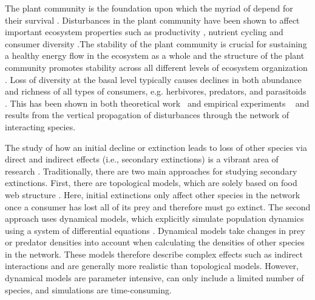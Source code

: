 \documentclass[12pt]{article}
\begin{document}
\begin{spacing}{2.0}
     The plant community is the foundation upon which the myriad of depend for their survival \citep{}. Disturbances in the plant community have been shown to affect important ecosystem properties such as productivity \citep{}, nutrient cycling \citep{} and consumer diversity \citep{scherber2010bottom}.The stability of the plant community is crucial for sustaining a healthy energy flow in the ecosystem as a whole \citep{Rosenblatt2016} and the structure of the plant community promotes stability across all different levels of ecosystem organization \citep{proulx2010diversity,scherber2010bottom}. Loss of diversity at the basal level typically causes declines in both abundance and richness of all types of consumers, e.g. herbivores, predators, and parasitoids \citep{scherber2010bottom}.
     This has been shown in both theoretical work~\citep{} and empirical experiments ~\citep{} and results from the vertical propagation of disturbances through the network of interacting species.
    
    The study of how an initial decline or extinction leads to loss of other species via direct and indirect effects (i.e., secondary extinctions) is a vibrant area of research \citep{curtsdotter2011robustness, dunne2009cascading, eklof2006species}. Traditionally, there are two main approaches for studying secondary extinctions. First, there are topological models, which are solely based on food web structure \citep{dunne2009cascading}. Here, initial extinctions only affect other species in the network once a consumer has lost all of its prey and therefore must go extinct. The second approach uses dynamical models, which explicitly simulate population dynamics using a system of differential equations \citep{binzer2011susceptibility}. Dynamical models take changes in prey or predator densities into account when calculating the densities of other species in the network. These models therefore describe complex effects such as indirect interactions and are generally more realistic than topological models. However, dynamical models are parameter intensive, can only include a limited number of species, and simulations are time-consuming. 
    

\end{spacing}
\end{document}

